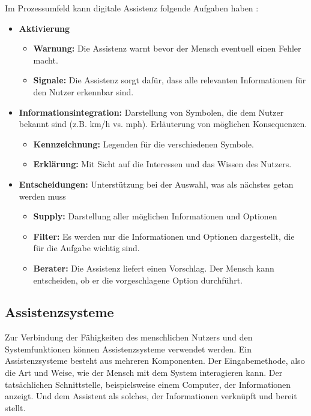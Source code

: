 Im Prozessumfeld kann digitale Assistenz folgende Aufgaben haben \cite{Wandke}:
\begin{itemize}
\item \textbf{Aktivierung}
	\begin{itemize}
	\item \textbf{Warnung:} Die Assistenz warnt bevor der Mensch eventuell einen Fehler macht.
	\item \textbf{Signale:} Die Assistenz sorgt dafür, dass alle relevanten Informationen für den Nutzer erkennbar sind.
	\end{itemize}
\item \textbf{Informationsintegration:} Darstellung von Symbolen, die dem Nutzer bekannt sind (z.B. km/h vs. mph). Erläuterung von möglichen Konsequenzen.
	\begin{itemize}
	\item \textbf{Kennzeichnung:} Legenden für die verschiedenen Symbole.
	\item \textbf{Erklärung:} Mit Sicht auf die Interessen und das Wissen des Nutzers.
	\end{itemize}
\item \textbf{Entscheidungen:} Unterstützung bei der Auswahl, was als nächstes getan werden muss
	\begin{itemize}
	\item \textbf{Supply:} Darstellung aller möglichen Informationen und Optionen
	\item \textbf{Filter:} Es werden nur die Informationen und Optionen dargestellt, die für die Aufgabe wichtig sind.
	\item \textbf{Berater:} Die Assistenz liefert einen Vorschlag. Der Mensch kann entscheiden, ob er die vorgeschlagene Option durchführt.
	\end{itemize}
\end{itemize}

\subsection{Assistenzsysteme}
\label{Assistenzsysteme}
Zur Verbindung der Fähigkeiten des menschlichen Nutzers und den Systemfunktionen können Assistenzsysteme verwendet werden. Ein Assistenzsysteme besteht aus mehreren Komponenten. Der Eingabemethode, also die Art und Weise, wie der Mensch mit dem System interagieren kann. Der tatsächlichen Schnittstelle, beispielsweise einem Computer, der Informationen anzeigt. Und dem Assistent als solches, der Informationen verknüpft und bereit stellt.

